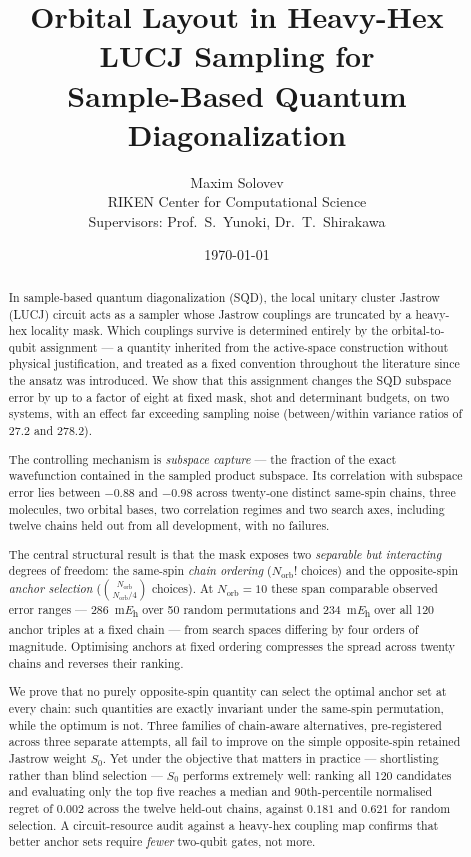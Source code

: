 \documentclass[11pt,a4paper]{article}
\title{\textbf{Orbital Layout in Heavy-Hex LUCJ Sampling for\\
Sample-Based Quantum Diagonalization}}
\author{Maxim Solovev\\
\small RIKEN Center for Computational Science\\
\small Supervisors: Prof.\ S.\ Yunoki, Dr.\ T.\ Shirakawa}
\date{\today}
\begin{document}
\maketitle

\begin{abstract}
\noindent
In sample-based quantum diagonalization (SQD), the local unitary cluster
Jastrow (LUCJ) circuit acts as a sampler whose Jastrow couplings are
truncated by a heavy-hex locality mask. Which couplings survive is determined
entirely by the orbital-to-qubit assignment --- a quantity inherited from the
active-space construction without physical justification, and treated as a
fixed convention throughout the literature since the ansatz was introduced.
We show that this assignment changes the SQD subspace error by up to a factor
of eight at fixed mask, shot and determinant budgets, on two systems, with an
effect far exceeding sampling noise (between/within variance ratios of 27.2
and 278.2).

The controlling mechanism is \emph{subspace capture} --- the fraction of the
exact wavefunction contained in the sampled product subspace. Its correlation
with subspace error lies between $-0.88$ and $-0.98$ across twenty-one
distinct same-spin chains, three molecules, two orbital bases, two
correlation regimes and two search axes, including twelve chains held out
from all development, with no failures.

The central structural result is that the mask exposes two \emph{separable
but interacting} degrees of freedom: the same-spin \emph{chain ordering}
($N_{\text{orb}}!$ choices) and the opposite-spin \emph{anchor selection}
($\binom{N_{\text{orb}}}{N_{\text{orb}}/4}$ choices). At $N_{\text{orb}}=10$
these span comparable observed error ranges --- \SI{286}{\milli\hartree} over
50 random permutations and \SI{234}{\milli\hartree} over all 120 anchor
triples at a fixed chain --- from search spaces differing by four orders of
magnitude. Optimising anchors at fixed ordering compresses the spread across
twenty chains and reverses their ranking.

We prove that no purely opposite-spin quantity can select the optimal anchor
set at every chain: such quantities are exactly invariant under the same-spin
permutation, while the optimum is not. Three families of chain-aware
alternatives, pre-registered across three separate attempts, all fail to
improve on the simple opposite-spin retained Jastrow weight $S_0$. Yet under
the objective that matters in practice --- shortlisting rather than blind
selection --- $S_0$ performs extremely well: ranking all 120 candidates and
evaluating only the top five reaches a median and 90th-percentile normalised
regret of $0.002$ across the twelve held-out chains, against $0.181$ and
$0.621$ for random selection. A circuit-resource audit against a heavy-hex
coupling map confirms that better anchor sets require \emph{fewer} two-qubit
gates, not more.
\end{abstract}
\end{document}
